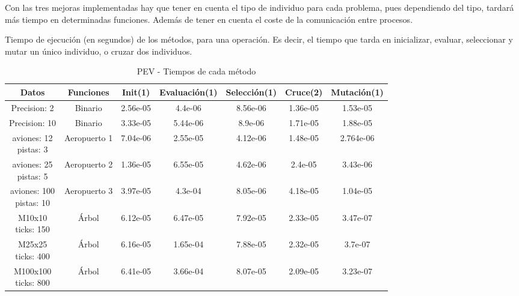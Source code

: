 Con las tres mejoras implementadas hay que tener en cuenta el tipo de individuo para cada problema, pues dependiendo del tipo, tardará más tiempo en determinadas funciones. Además de tener en cuenta el coste de la comunicación entre procesos.

Tiempo de ejecución (en segundos) de los métodos, para una operación. Es decir, el tiempo que tarda en inicializar, evaluar, seleccionar y mutar un único individuo, o cruzar dos individuos. 



\begin{center}
	\begin{table}[!h]
		\centering
		\begin{tabular}{|c|c|c|c|c|c|c|}
			\hline
			\rowcolor{lightgray}
			\textbf{Datos} & \textbf{Funciones} & \textbf{Init(1)} & \textbf{Evaluación(1)} & \textbf{Selección(1)} & \textbf{Cruce(2)} & \textbf{Mutación(1)} \\
			\hline
			Precision: 2 & Binario & 2.56e-05 & 4.4e-06 & 8.56e-06 & \cellcolor{redcell} 1.36e-05 & \cellcolor{redcell} 1.53e-05 \\
			\hline
			Precision: 10 & Binario & 3.33e-05 & 5.44e-06 & 8.9e-06 & \cellcolor{redcell} 1.71e-05 & \cellcolor{redcell} 1.88e-05 \\
			\hline
			\makecell{aviones: 12 \\ pistas: 3} & Aeropuerto 1 & 7.04e-06 & \cellcolor{redcell} 2.55e-05 & 4.12e-06 & 1.48e-05 & 2.764e-06 \\
			\hline
			\makecell{aviones: 25 \\ pistas: 5} & Aeropuerto 2 & 1.36e-05 & \cellcolor{redcell} 6.55e-05 & 4.62e-06 & 2.4e-05 & 3.43e-06 \\
			\hline
			\makecell{aviones: 100 \\ pistas: 10} & Aeropuerto 3 & 3.97e-05 & \cellcolor{redcell} 4.3e-04 & 8.05e-06 & 4.18e-05 & 1.04e-05 \\
			\hline
			\makecell{M10x10 \\ ticks: 150} & Árbol & 6.12e-05 & \cellcolor{redcell} 6.47e-05 & 7.92e-05 & 2.33e-05 & 3.47e-07 \\
			\hline
			\makecell{M25x25 \\ ticks: 400} & Árbol & 6.16e-05 & \cellcolor{redcell} 1.65e-04 & 7.88e-05 & 2.32e-05 & 3.7e-07 \\
			\hline
			\makecell{M100x100 \\ ticks: 800} & Árbol & 6.41e-05 & \cellcolor{redcell} 3.66e-04 & 8.07e-05 & 2.09e-05 & 3.23e-07 \\
			\hline
		\end{tabular}
		\caption{PEV - Tiempos de cada método}
		\label{tab:sample}
	\end{table}
\end{center}

